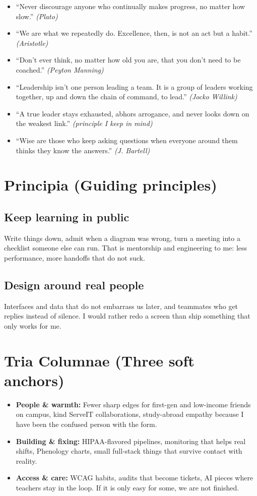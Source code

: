 \documentclass[11pt]{article}
\begin{document}
\begin{itemize}[leftmargin=*]
    \item ``Never discourage anyone who continually makes progress, no matter how slow.'' \textit{(Plato)}
    \item ``We are what we repeatedly do. Excellence, then, is not an act but a habit.'' \textit{(Aristotle)}
    \item ``Don't ever think, no matter how old you are, that you don't need to be coached.'' \textit{(Peyton Manning)}
    \item ``Leadership isn't one person leading a team. It is a group of leaders working together, up and down the chain of command, to lead.'' \textit{(Jocko Willink)}
    \item ``A true leader stays exhausted, abhors arrogance, and never looks down on the weakest link.'' \textit{(principle I keep in mind)}
    \item ``Wise are those who keep asking questions when everyone around them thinks they know the answers.'' \textit{(J. Bartell)}
\end{itemize}

\section*{Principia (Guiding principles)}

\subsection*{Keep learning in public}
Write things down, admit when a diagram was wrong, turn a meeting into a checklist someone else can run. That is mentorship and engineering to me: less performance, more handoffs that do not suck.

\subsection*{Design around real people}
Interfaces and data that do not embarrass us later, and teammates who get replies instead of silence. I would rather redo a screen than ship something that only works for me.

\section*{Tria Columnae (Three soft anchors)}

\begin{itemize}[leftmargin=*]
    \item \textbf{People \& warmth:} Fewer sharp edges for first-gen and low-income friends on campus, kind ServeIT collaborations, study-abroad empathy because I have been the confused person with the form.
    \item \textbf{Building \& fixing:} HIPAA-flavored pipelines, monitoring that helps real shifts, Phenology charts, small full-stack things that survive contact with reality.
    \item \textbf{Access \& care:} WCAG habits, audits that become tickets, AI pieces where teachers stay in the loop. If it is only easy for some, we are not finished.
\end{itemize}
\end{document}
